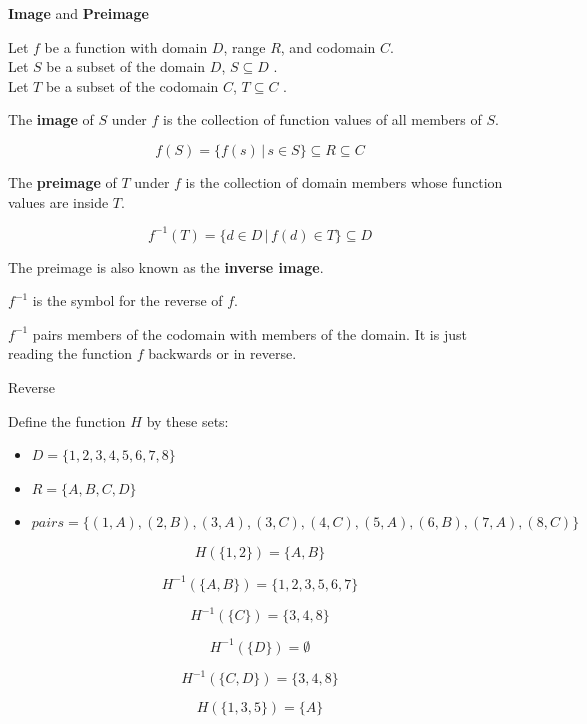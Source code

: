 \documentclass{ximera}
\begin{document}
\begin{definition} \textbf{\textcolor{green!50!black}{Image}} and \textbf{\textcolor{green!50!black}{Preimage}} 


Let $f$ be a function with domain $D$, range $R$, and codomain $C$. \\
Let $S$ be a subset of the domain $D$, $S \subseteq D$ . \\
Let $T$ be a subset of the codomain $C$, $T \subseteq C$ . 


The \textbf{image} of $S$ under $f$ is the collection of function values of all members of $S$.

\[
f(S) = \{ f(s) \, | \, s \in S   \} \subseteq R \subseteq C
\]




The \textbf{preimage} of $T$ under $f$ is the collection of domain members whose function values are inside $T$.

\[
f^{-1}(T) = \{ d \in D \, | \, f(d) \in T  \} \subseteq D
\]


The preimage is also known as the \textbf{inverse image}.

$f^{-1}$ is the symbol for the reverse of $f$. 


$f^{-1}$ pairs members of the codomain with members of the domain.  It is just reading the function $f$ backwards or in reverse.



\end{definition}





\newpage



\begin{example} Reverse


Define the function $H$ by these sets: 


\begin{itemize}
	\item  $D = \{ 1, 2, 3, 4, 5, 6, 7, 8 \}$
	\item  $R = \{ A, B, C, D \}$
	\item  $pairs = \{ (1, A), (2, B), (3, A), (3, C), (4, C), (5, A), (6, B), (7, A), (8, C)    \}$
\end{itemize}


\[  H(\{ 1, 2 \}) = \{ A, B \}  \]

\[  H^{-1}(\{ A, B \}) = \{ 1, 2, 3, 5, 6, 7 \}  \]

\[  H^{-1}(\{ C \}) = \{ 3, 4, 8 \}  \]

\[  H^{-1}(\{ D \}) = \emptyset  \]

\[  H^{-1}(\{ C, D \}) = \{ 3, 4, 8 \}  \]

\[  H(\{ 1, 3, 5 \}) = \{ A \}  \]


\end{example}
\end{document}

